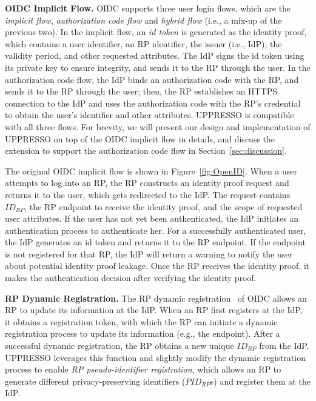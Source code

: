 \vspace{1mm}\noindent\textbf{OIDC Implicit Flow.}
 OIDC supports three user login flows, which are the {\em implicit flow}, {\em authorization code flow} and {\em hybrid flow} (i.e., a mix-up of the previous two).
 In the implicit flow, an {\em id token} is generated as the identity proof, which contains a user identifier, an RP identifier,
    the issuer (i.e., IdP), the validity period, and other requested attributes.
The IdP signs the id token using its private key to ensure integrity, and sends it to the RP through the user.
In the authorization code flow, the IdP binds an authorization code with the RP, and sends it to the RP through the user;
then, the RP establishes an HTTPS connection to the IdP %
    and uses the authorization code with the RP's credential to obtain the user's identifier and other attributes.
UPPRESSO is compatible with all three flows. For brevity, we will present our design and implementation of UPPRESSO on top of the OIDC implicit flow in details, and discuss the extension to support the authorization code flow in Section~\ref{sec:discussion}.

The original OIDC implicit flow is shown in Figure~\ref{fig:OpenID}. When a user attempts to log into an RP,
    the RP constructs an identity proof request and returns it to the user, which gets redirected to the IdP.
The request contains $ID_{RP}$, the RP endpoint to receive the identity proof, and the scope of requested user attributes.
If the user has not yet been authenticated, the IdP initiates an authentication process to authenticate her.
For a successfully authenticated user, the IdP generates an id token  and returns it to the RP endpoint.
If the endpoint is not registered for that RP,
    the IdP will return a warning to notify the user about potential identity proof leakage.
Once the RP receives the identity proof, it makes the authentication decision after verifying the identity proof.

\vspace{1mm}\noindent\textbf{RP Dynamic Registration.} The RP dynamic registration~\cite{DynamicRegistration} of OIDC allows an RP to update its information at the IdP. When an RP first registers at the IdP, it obtains a registration token, with which the RP can initiate a dynamic registration process to update its information (e.g., the endpoint).
After a successful dynamic registration, the RP obtains a new unique $ID_{RP}$ from the IdP.
UPPRESSO leverages this function and slightly modify the dynamic registration process to enable {\em RP pseudo-identifier registration},
 which allows an RP to generate different privacy-preserving identifiers ($PID_{RP}$s) and register them at the IdP.

